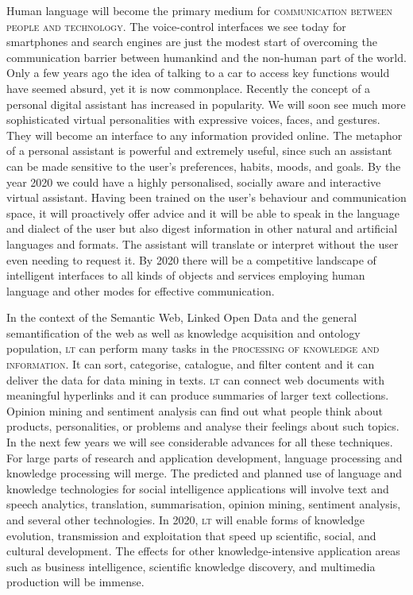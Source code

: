 \documentclass[output=paper]{LSP/langsci}
\begin{document}
Human language will become the primary medium for
\textsc{communication between people and technology}. The
voice-control interfaces we see today for smart\-phones and search engines are just
the modest start of overcoming the communication barrier between
humankind and the non-human part of the world. Only a few years ago
the idea of talking to a car to access key functions would have seemed
absurd, yet it is now commonplace. Recently the concept of a personal
digital assistant has increased in popularity. We will soon see much
more sophisticated virtual personalities with expressive voices,
faces, and gestures. They will become an interface to any information
provided online. The metaphor of a personal assistant is powerful and
extremely useful, since such an assistant can be made sensitive to the
user's preferences, habits, moods, and goals. By the year 2020 we
could have a highly personalised, socially aware and interactive
virtual assistant. Having been trained on the user's behaviour and
communication space, it will proactively offer advice and it will be
able to speak in the language and dialect of the user but also digest
information in other natural and artificial languages and formats. The
assistant will translate or interpret without the user even needing to
request it. By 2020 there will be a competitive landscape of
intelligent interfaces to all kinds of objects and services employing
human language and other modes for effective communication. 

In the context of the Semantic Web, Linked Open Data and the general
semantification of the web as well as knowledge acquisition and
ontology population, \textsc{lt} can perform many tasks in the
\textsc{processing of knowledge and information}. It can sort,
categorise, catalogue, and filter content and it can deliver the data
for data mining in texts. \textsc{lt} can connect web documents with meaningful
hyperlinks and it can produce summaries of larger text
collections. Opinion mining and sentiment analysis can find out what
people think about products, personalities, or problems and analyse
their feelings about such topics. In the next few years we will see
considerable advances for all these techniques. For large parts of
research and application development, language processing and
knowledge processing will merge. The predicted and planned use of
language and knowledge technologies for social intelligence
applications will involve text and speech analytics, translation,
summarisation, opinion mining, sentiment analysis, and several other
technologies. In 2020, \textsc{lt} will enable forms of knowledge evolution,
transmission and exploitation that speed up scientific, social, and
cultural development. The effects for other knowledge-intensive
application areas such as business intelligence, scientific knowledge
discovery, and multimedia production will be immense.
\end{document}

